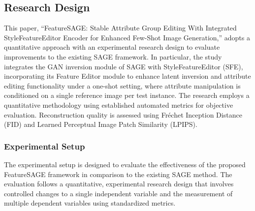 \subsection{Research Design}

This paper, ``FeatureSAGE: Stable Attribute Group Editing With Integrated StyleFeatureEditor Encoder for Enhanced Few-Shot Image Generation,'' adopts a quantitative approach with an experimental research design to evaluate improvements to the existing SAGE framework. In particular, the study integrates the GAN inversion module of SAGE with StyleFeatureEditor (SFE), incorporating its Feature Editor module to enhance latent inversion and attribute editing functionality under a one-shot setting, where attribute manipulation is conditioned on a single reference image per test instance. The research employs a quantitative methodology using established automated metrics for objective evaluation. Reconstruction quality is assessed using Fr\'echet Inception Distance (FID) and Learned Perceptual Image Patch Similarity (LPIPS).

\subsubsection{Experimental Setup}

The experimental setup is designed to evaluate the effectiveness of the proposed FeatureSAGE framework in comparison to the existing SAGE method. The evaluation follows a quantitative, experimental research design that involves controlled changes to a single independent variable and the measurement of multiple dependent variables using standardized metrics.

